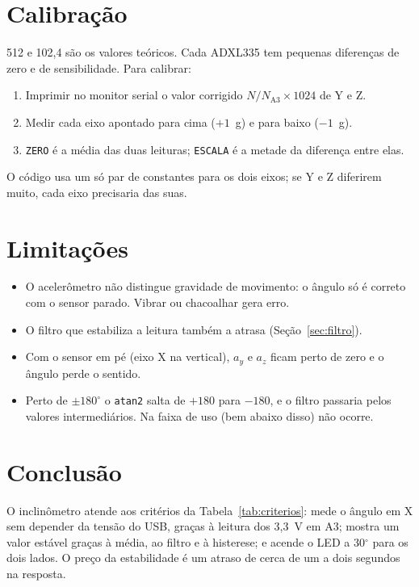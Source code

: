 \documentclass[11pt,a4paper]{article}
\begin{document}
\section{Calibração}\label{sec:calib}
512 e 102,4 são os valores teóricos. Cada ADXL335 tem pequenas
diferenças de zero e de sensibilidade. Para calibrar:
\begin{enumerate}
  \item Imprimir no monitor serial o valor corrigido
    $N/N_\text{A3}\times 1024$ de Y e Z.
  \item Medir cada eixo apontado para cima ($+1$~g) e para baixo
    ($-1$~g).
  \item \texttt{ZERO} é a média das duas leituras; \texttt{ESCALA} é a
    metade da diferença entre elas.
\end{enumerate}
O código usa um só par de constantes para os dois eixos; se Y e Z
diferirem muito, cada eixo precisaria das suas.

\section{Limitações}
\begin{itemize}
  \item O acelerômetro não distingue gravidade de movimento: o ângulo
    só é correto com o sensor parado. Vibrar ou chacoalhar gera erro.
  \item O filtro que estabiliza a leitura também a atrasa
    (Seção~\ref{sec:filtro}).
  \item Com o sensor em pé (eixo X na vertical), $a_y$ e $a_z$ ficam
    perto de zero e o ângulo perde o sentido.
  \item Perto de $\pm180^\circ$ o \texttt{atan2} salta de $+180$ para
    $-180$, e o filtro passaria pelos valores intermediários. Na faixa
    de uso (bem abaixo disso) não ocorre.
\end{itemize}

\section{Conclusão}
O inclinômetro atende aos critérios da Tabela~\ref{tab:criterios}: mede
o ângulo em X sem depender da tensão do USB, graças à leitura dos
3,3~V em A3; mostra um valor estável graças à média, ao filtro e à
histerese; e acende o LED a 30$^\circ$ para os dois lados. O preço da
estabilidade é um atraso de cerca de um a dois segundos na resposta.
\end{document}
